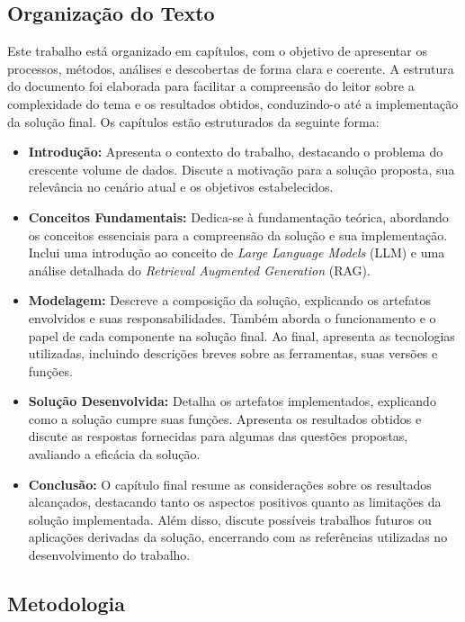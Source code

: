 \documentclass[a4paper, 12pt]{article}
\begin{document}
    \subsection{Organização do Texto}

    Este trabalho está organizado em capítulos, com o objetivo de apresentar os processos, métodos, análises e descobertas de forma clara e coerente. A estrutura do documento foi elaborada para facilitar a compreensão do leitor sobre a complexidade do tema e os resultados obtidos, conduzindo-o até a implementação da solução final. Os capítulos estão estruturados da seguinte forma:
    
    \begin{itemize}
        \item \textbf{Introdução:} Apresenta o contexto do trabalho, destacando o problema do crescente volume de dados. Discute a motivação para a solução proposta, sua relevância no cenário atual e os objetivos estabelecidos.
        \item \textbf{Conceitos Fundamentais:} Dedica-se à fundamentação teórica, abordando os conceitos essenciais para a compreensão da solução e sua implementação. Inclui uma introdução ao conceito de \textit{Large Language Models} (LLM) e uma análise detalhada do \textit{Retrieval Augmented Generation} (RAG).
        \item \textbf{Modelagem:} Descreve a composição da solução, explicando os artefatos envolvidos e suas responsabilidades. Também aborda o funcionamento e o papel de cada componente na solução final. Ao final, apresenta as tecnologias utilizadas, incluindo descrições breves sobre as ferramentas, suas versões e funções.
        \item \textbf{Solução Desenvolvida:} Detalha os artefatos implementados, explicando como a solução cumpre suas funções. Apresenta os resultados obtidos e discute as respostas fornecidas para algumas das questões propostas, avaliando a eficácia da solução.
        \item \textbf{Conclusão:} O capítulo final resume as considerações sobre os resultados alcançados, destacando tanto os aspectos positivos quanto as limitações da solução implementada. Além disso, discute possíveis trabalhos futuros ou aplicações derivadas da solução, encerrando com as referências utilizadas no desenvolvimento do trabalho.
    \end{itemize}

    \subsection{Metodologia}
\end{document}
